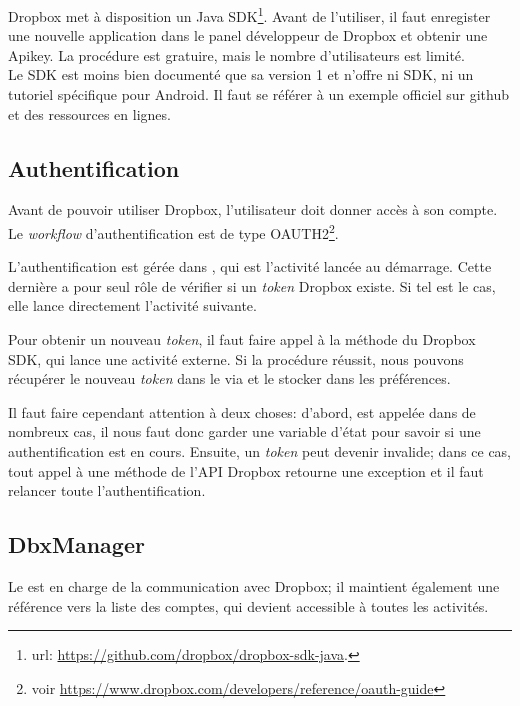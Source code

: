 Dropbox met à disposition un Java SDK\footnote{url: \url{https://github.com/dropbox/dropbox-sdk-java}.}. Avant de l'utiliser, il faut enregister une nouvelle application dans le panel développeur de Dropbox et obtenir une Apikey. La procédure est gratuire, mais le nombre d'utilisateurs est limité. \\
Le SDK est moins bien documenté que sa version 1 et n'offre ni SDK, ni un tutoriel spécifique pour Android. Il faut se référer à un exemple officiel sur github et des ressources en lignes.

\subsection{Authentification}

Avant de pouvoir utiliser Dropbox, l'utilisateur doit donner accès à son compte. 
Le \emph{workflow} d'authentification est de type OAUTH2\footnote{voir \url{https://www.dropbox.com/developers/reference/oauth-guide}}. 

L'authentification est gérée dans , qui est l'activité lancée au démarrage. Cette dernière a pour seul rôle de vérifier si un \emph{token} Dropbox existe. Si tel est le cas, elle lance directement l'activité suivante.

Pour obtenir un nouveau \emph{token}, il faut faire appel à la méthode  du Dropbox SDK, qui lance une activité externe. Si la procédure réussit, nous pouvons récupérer le nouveau \emph{token} dans le  via  et le stocker dans les préférences. 

Il faut faire cependant attention à deux choses: d'abord,  est appelée dans de nombreux cas, il nous faut donc garder une variable d'état pour savoir si une authentification est en cours. Ensuite, un \emph{token} peut devenir invalide; dans ce cas, tout appel à une méthode de l'API Dropbox retourne une exception et il faut relancer toute l'authentification. 

\subsection{DbxManager}

Le  est en charge de la communication avec Dropbox; il maintient également une référence vers la liste des comptes, qui devient accessible à toutes les activités.  

